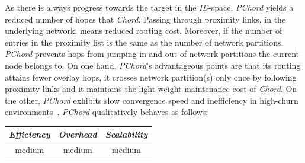 As there is always progress towards the target in the \emph{ID}-space,
\emph{PChord} yields a reduced number of hopes that \emph{Chord}.
Passing through proximity links, in the underlying network, 
means reduced routing cost. 
Moreover, if the number of entries in the proximity list is the same
as the number of network partitions, 
\emph{PChord} prevents hops from jumping in and
out of network partitions the current node belongs to.
On one hand, 
\emph{PChord}’s advantageous  points are that 
its routing attains fewer overlay hops, 
it crosses network partition(s) only once by following proximity links
and it maintains the light-weight maintenance cost of \emph{Chord}.
On the other, \emph{PChord} exhibits slow convergence speed 
and inefficiency in high-churn environments~\cite{DK2006}.
\emph{PChord} qualitatively behaves as follows:
\begin{center}
{\footnotesize
\begin{tabular}{ccc}
\emph{Efficiency} & \emph{Overhead} & \emph{Scalability} \\
\hline
medium &
medium &
medium
\end{tabular}
}
\end{center}

